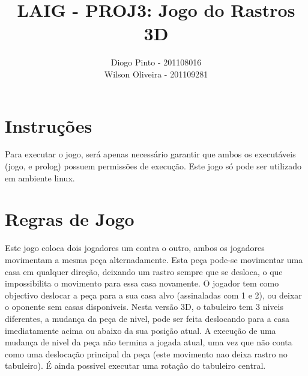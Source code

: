 \documentclass[11pt,a4paper]{report}
\begin{document}
\title{LAIG - PROJ3: Jogo do Rastros 3D}
\author{Diogo Pinto - 201108016 \\ Wilson Oliveira - 201109281}

\pagestyle{fancy}
	
\lhead{\rightmark}
\chead{}
\rhead{\leftmark}
	
\lfoot{}
\cfoot{\thepage}
\rfoot{}	

\maketitle

\section{Instruções}
Para executar o jogo, será apenas necessário garantir que ambos os executáveis (jogo, e prolog) possuem permissões de execução. 
Este jogo só pode ser utilizado em ambiente linux.

\section{Regras de Jogo}
Este jogo coloca dois jogadores um contra o outro, ambos os jogadores movimentam a mesma peça alternadamente. Esta peça pode-se movimentar uma casa em qualquer direção, deixando um rastro sempre que se desloca, o que impossibilita o movimento para essa casa novamente.
O jogador tem como objectivo deslocar a peça para a sua casa alvo (assinaladas com 1 e 2), ou deixar o oponente sem casas disponiveis.
Nesta versão 3D, o tabuleiro tem 3 niveis diferentes, a mudança da peça de nivel, pode ser feita deslocando para a casa imediatamente acima ou abaixo da sua posição atual. A execução de uma mudança de nivel da peça não termina a jogada atual, uma vez que não conta como uma deslocação principal da peça (este movimento nao deixa rastro no tabuleiro). É ainda possivel executar uma rotação do tabuleiro central.
\end{document}
